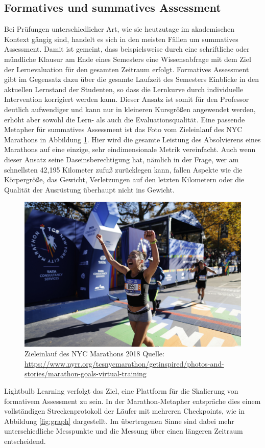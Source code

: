 \subsection{Formatives und summatives Assessment}
Bei Prüfungen unterschiedlicher Art, wie sie heutzutage im akademischen Kontext gängig sind, handelt es sich in den meisten Fällen um summatives Assessment. Damit ist gemeint, dass beispielsweise durch eine schriftliche oder mündliche Klausur am Ende eines Semesters eine Wissensabfrage mit dem Ziel der Lernevaluation für den gesamten Zeitraum erfolgt. Formatives Assessment gibt im Gegensatz dazu über die gesamte Laufzeit des Semesters Einblicke in den aktuellen Lernstand der Studenten, so dass die Lernkurve durch individuelle Intervention korrigiert werden kann. Dieser Ansatz ist somit für den Professor deutlich aufwendiger und kann nur in kleineren Kursgrößen angewendet werden, erhöht aber sowohl die Lern- als auch die Evaluationsqualität. Eine passende Metapher für summatives Assessment ist das Foto vom Zieleinlauf des NYC Marathons in Abbildung \ref{fig:mara}. Hier wird die gesamte Leistung des Absolvierens eines Marathons auf eine einzige, sehr eindimensionale Metrik vereinfacht. Auch wenn dieser Ansatz seine Daseinsberechtigung hat, nämlich in der Frage, wer am schnellsten 42,195 Kilometer zufuß zurücklegen kann, fallen Aspekte wie die Körpergröße, das Gewicht, Verletzungen auf den letzten Kilometern oder die Qualität der Ausrüstung überhaupt nicht ins Gewicht.

\begin{figure}[H]
    \centering
    \includegraphics[width = .5\textwidth]{images/nycm.jpeg}
    \caption{Zieleinlauf des NYC Marathons 2018
        \newline
        Quelle: \url{https://www.nyrr.org/tcsnycmarathon/getinspired/photos-and-stories/marathon-goals-virtual-training}
    }
    \label{fig:mara}
\end{figure}

\noindent Lightbulb Learning verfolgt das Ziel, eine Plattform für die Skalierung von formativem Assessment zu sein. In der Marathon-Metapher entspräche dies einem vollständigen Streckenprotokoll der Läufer mit mehreren Checkpoints, wie in Abbildung \ref{fig:graph} dargestellt. Im übertragenen Sinne sind dabei mehr unterschiedliche Messpunkte und die Messung über einen längeren Zeitraum entscheidend.

